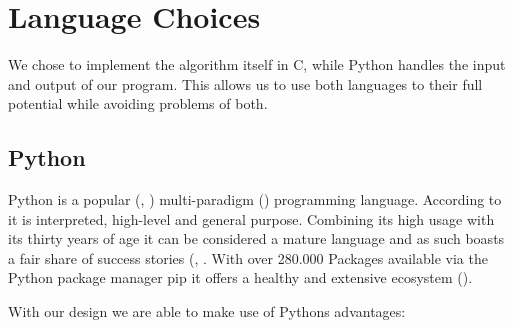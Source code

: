 \hypertarget{language-choices}{%
\section{Language Choices}\label{language-choices}}

We chose to implement the algorithm itself in C, while Python handles
the input and output of our program. This allows us to use both
languages to their full potential while avoiding problems of both.

\hypertarget{python}{%
\subsection{Python}\label{python}}

Python is a popular (\cite{instack}, \cite{octgit}) multi-paradigm (\cite[p. 6]{learningpython})
programming language. According to \cite{wikipython} it is interpreted,
high-level and general purpose. Combining its high usage with its thirty
years of age it can be considered a mature language and as such boasts a
fair share of success stories (\cite{pythonsuccess}, \cite[p. 9 - 10]{learningpython}. With
over 280.000 Packages available via the Python package manager pip it
offers a healthy and extensive ecosystem (\cite{pythonpackages}).

With our design we are able to make use of Pythons advantages:

